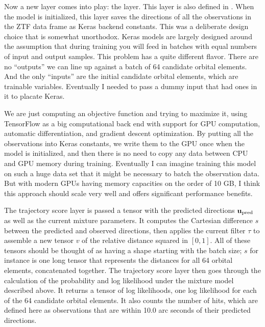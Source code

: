 Now a new layer comes into play: the  layer.
This layer is also defined in .
When the model is initialized, this layer saves the directions of all the observations in the ZTF data frame as Keras backend constants.
This was a deliberate design choice that is somewhat unorthodox.
Keras models are largely designed around the assumption that during training you will feed in batches with equal numbers of input and output samples.
This problem has a quite different flavor.
There are no ``outputs'' we can line up against a batch of 64 candidate orbital elements.
And the only ``inputs'' are the initial candidate orbital elements, which are trainable variables.
Eventually I needed to pass a dummy input that had  ones in it to placate Keras.

We are just computing an objective function and trying to maximize it, using TensorFlow as a big computational back end with
support for GPU computation, automatic differentiation, and gradient descent optimization.
By putting all the observations into Keras constants, we write them to the GPU once when the model is initialized,
and then there is no need to copy any data between CPU and GPU memory during training.
Eventually I can imagine training this model on such a huge data set that it might be necessary to batch the observation data.
But with modern GPUs having memory capacities on the order of 10 GB, I think this approach should scale very well and offers significant performance benefits.

The trajectory score layer is passed a tensor with the predicted directions $\mathbf{u}_{\mathrm{pred}}$ as well as the current mixture parameters.
It computes the Cartesian difference $s$ between the predicted and observed directions, 
then applies the current filter $\tau$ to assemble a new tensor $v$ of the relative distance squared in $[0,1]$.
All of these tensors should be thought of as having a shape starting with the batch size;
$s$ for instance is one long tensor that represents the distances for all 64 orbital elements, concatenated together.
The trajectory score layer then goes through the calculation of the probability and log likelihood under the mixture model described above.
It returns a tensor of log likelihoods, one log likelihood for each of the 64 candidate orbital elements.
It also counts the number of hits, which are defined here as observations that are within 10.0 arc seconds of their predicted directions.


